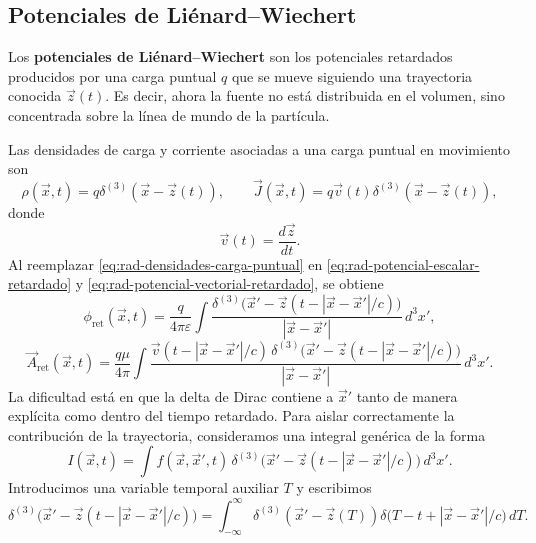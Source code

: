 \documentclass[12pt,a4paper]{article}
\theoremstyle{definition}
\theoremstyle{plain}
\numberwithin{equation}{section}
\theoremstyle{remark}
\begin{document}
\subsection{Potenciales de Liénard--Wiechert}
\label{subsec:potenciales-lienard-wiechert}

Los \textbf{potenciales de Liénard--Wiechert} son los potenciales retardados producidos por una carga puntual $q$ que se mueve siguiendo una trayectoria conocida $\vec z(t)$. Es decir, ahora la fuente no está distribuida en el volumen, sino concentrada sobre la línea de mundo de la partícula.

Las densidades de carga y corriente asociadas a una carga puntual en movimiento son
\begin{equation}
    \rho(\vec x,t)=q\delta^{(3)}(\vec x-\vec z(t)),
    \qquad
    \vec J(\vec x,t)=q\vec v(t)\delta^{(3)}(\vec x-\vec z(t)),
    \label{eq:rad-densidades-carga-puntual}
\end{equation}
donde
\begin{equation*}
    \vec v(t)=\frac{d\vec z}{dt}.
\end{equation*}
Al reemplazar \eqref{eq:rad-densidades-carga-puntual} en \eqref{eq:rad-potencial-escalar-retardado} y \eqref{eq:rad-potencial-vectorial-retardado}, se obtiene
\begin{equation}
    \phi_{\mathrm{ret}}(\vec x,t)=
    \frac{q}{4\pi\varepsilon}\int
    \frac{\delta^{(3)}\!\bigl(\vec x'-\vec z(t-|\vec x-\vec x'|/c)\bigr)}{|\vec x-\vec x'|}\,d^3x',
    \label{eq:rad-lw-phi-integral-inicial}
\end{equation}
\begin{equation}
    \vec A_{\mathrm{ret}}(\vec x,t)=
    \frac{q\mu}{4\pi}\int
    \frac{\vec v(t-|\vec x-\vec x'|/c)\,
    \delta^{(3)}\!\bigl(\vec x'-\vec z(t-|\vec x-\vec x'|/c)\bigr)}{|\vec x-\vec x'|}\,d^3x'.
    \label{eq:rad-lw-A-integral-inicial}
\end{equation}
La dificultad está en que la delta de Dirac contiene a $\vec x'$ tanto de manera explícita como dentro del tiempo retardado. Para aislar correctamente la contribución de la trayectoria, consideramos una integral genérica de la forma
\begin{equation}
    I(\vec x,t)=\int
    f(\vec x,\vec x',t)\,
    \delta^{(3)}\!\bigl(\vec x'-\vec z(t-|\vec x-\vec x'|/c)\bigr)\,d^3x'.
    \label{eq:rad-lw-integral-generica}
\end{equation}
Introducimos una variable temporal auxiliar $T$ y escribimos
\begin{equation}
    \delta^{(3)}\!\bigl(\vec x'-\vec z(t-|\vec x-\vec x'|/c)\bigr)
    =\int_{-\infty}^{\infty}
    \delta^{(3)}(\vec x'-\vec z(T))
    \delta\!\bigl(T-t+|\vec x-\vec x'|/c\bigr)\,dT.
    \label{eq:rad-lw-delta-auxiliar}
\end{equation}
\end{document}
